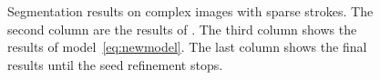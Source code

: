 \documentclass{article}
\begin{document}
\begin{figure}[!htb]
\begin{center}
\vspace{-5mm}
\end{center}
   \caption{Segmentation results on complex images with sparse strokes. The second column are the results of \cite{nguyen2012robust}. The third column shows the results of model~\eqref{eq:newmodel}. The last column shows the final results until the seed refinement stops.}
\label{fig:fig4}
\end{figure}
\end{document}
